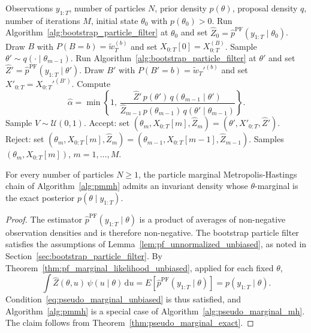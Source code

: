 \begin{algorithm}
\caption{Particle marginal Metropolis-Hastings}
\label{alg:pmmh}
\begin{algorithmic}[1]
    \REQUIRE Observations $y_{1:T}$, number of particles $N$, prior density $p(\theta)$, proposal density $q$, number of iterations $M$, initial state $\theta_0$ with $p(\theta_0)>0$.
    \STATE Run Algorithm~\ref{alg:bootstrap_particle_filter} at $\theta_0$ and set $\hat{Z}_0 = \hat{p}^{\mathrm{PF}}(y_{1:T}\mid\theta_0)$.
    \STATE Draw $B$ with $P(B=b) = \tilde{w}_T^{(b)}$ and set $X_{0:T}[0] = X_{0:T}^{(B)}$.
        \STATE Sample $\theta'\sim q(\cdot\mid\theta_{m-1})$.
        \STATE Run Algorithm~\ref{alg:bootstrap_particle_filter} at $\theta'$ and set $\hat{Z}' = \hat{p}^{\mathrm{PF}}(y_{1:T}\mid\theta')$.
        \STATE Draw $B'$ with $P(B'=b) = \tilde{w}_T'^{(b)}$ and set $X'_{0:T} = X_{0:T}'^{(B')}$.
        \STATE Compute
        \begin{equation*}
            \hat{\alpha} = \min\left\{1,\, \frac{\hat{Z}'\,p(\theta')\,q(\theta_{m-1}\mid\theta')}{\hat{Z}_{m-1}\,p(\theta_{m-1})\,q(\theta'\mid\theta_{m-1})}\right\}.
        \end{equation*}
        \STATE Sample $V\sim\mathcal{U}(0,1)$.
            \STATE Accept: set $(\theta_m,X_{0:T}[m],\hat{Z}_m) = (\theta',X'_{0:T},\hat{Z}')$.
        \ELSE
            \STATE Reject: set $(\theta_m,X_{0:T}[m],\hat{Z}_m) = (\theta_{m-1},X_{0:T}[m-1],\hat{Z}_{m-1})$.
        \ENDIF
    \ENDFOR
    \RETURN Samples $(\theta_m,X_{0:T}[m])$, $m=1,\ldots,M$.
\end{algorithmic}
\end{algorithm}

\begin{theorem}
    \label{thm:pmmh_exact}
    For every number of particles $N\ge 1$, the particle marginal Metropolis-Hastings chain of Algorithm~\ref{alg:pmmh} admits an invariant density whose $\theta$-marginal is the exact posterior $p(\theta\mid y_{1:T})$.
\end{theorem}
\begin{proof}
    The estimator $\hat{p}^{\mathrm{PF}}(y_{1:T}\mid\theta)$ is a product of averages of non-negative observation densities and is therefore non-negative. The bootstrap particle filter satisfies the assumptions of Lemma~\ref{lem:pf_unnormalized_unbiased}, as noted in Section~\ref{sec:bootstrap_particle_filter}. By Theorem~\ref{thm:pf_marginal_likelihood_unbiased}, applied for each fixed $\theta$,
    \begin{equation}
        \int \hat{Z}(\theta,u)\,\psi(u\mid\theta)\,\mathrm{d}u = E\left[\hat{p}^{\mathrm{PF}}(y_{1:T}\mid\theta)\right] = p(y_{1:T}\mid\theta).
    \end{equation}
    Condition~\eqref{eq:pseudo_marginal_unbiased} is thus satisfied, and Algorithm~\ref{alg:pmmh} is a special case of Algorithm~\ref{alg:pseudo_marginal_mh}. The claim follows from Theorem~\ref{thm:pseudo_marginal_exact}.
\end{proof}


